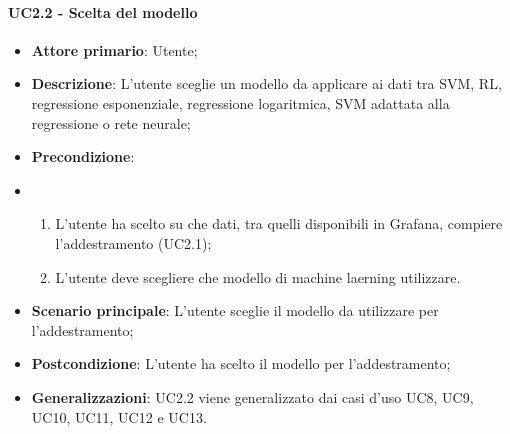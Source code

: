 \paragraph{UC2.2 - Scelta del modello}
\label{para:uc2.2}
\begin{itemize}
  \item \textbf{Attore primario}: Utente;
  \item \textbf{Descrizione}: L'utente sceglie un modello da applicare ai dati tra SVM, RL, regressione esponenziale, regressione logaritmica, SVM adattata alla regressione o rete neurale;
  \item \textbf{Precondizione}:
  \item \begin{enumerate}
    \item L'utente ha scelto su che dati, tra quelli disponibili in Grafana, compiere l'addestramento (UC2.1);
    \item L'utente deve scegliere che modello di machine laerning utilizzare.
  \end{enumerate}
  \item \textbf{Scenario principale}: L'utente sceglie il modello da utilizzare per l'addestramento;
  \item \textbf{Postcondizione}: L'utente ha scelto il modello per l'addestramento;
  \item \textbf{Generalizzazioni}: UC2.2 viene generalizzato dai casi d'uso UC8, UC9, UC10, UC11, UC12 e UC13.
\end{itemize}

